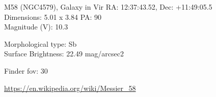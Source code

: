 \begin{block}{M58 (NGC4579), Galaxy in Vir}
    RA: 12:37:43.52, Dec: +11:49:05.5 \\ 
    Dimensions: 5.01 x 3.84 PA: 90 \\ 
    Magnitude (V): 10.3

    Morphological type: Sb \\ 
    Surface Brightness: 22.49 mag/arcsec2 


    Finder fov: 30 

    \url{https://en.wikipedia.org/wiki/Messier_58} 
\end{block}